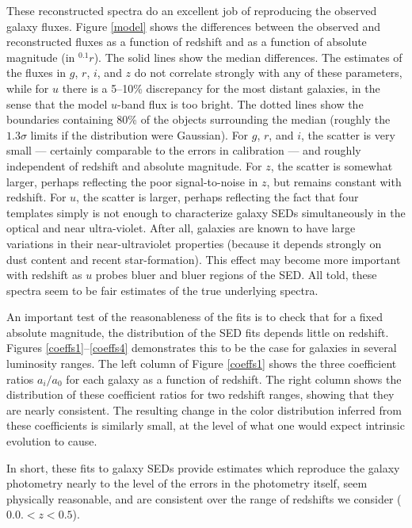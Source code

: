 \documentclass[10pt,preprint]{aastex}
\newcommand{\band}[2]{\ensuremath{^{#1}{#2}}}
\begin{document}
These reconstructed spectra do an excellent job of reproducing the
observed galaxy fluxes. Figure \ref{model} shows the differences
between the observed and reconstructed fluxes as a function of
redshift and as a function of absolute magnitude (in $\band{0.1}{r}$).
The solid lines show the median differences. The estimates of the
fluxes in $g$, $r$, $i$, and $z$ do not correlate strongly with any of
these parameters, while for $u$ there is a 5--10\% discrepancy for the
most distant galaxies, in the sense that the model $u$-band flux is
too bright. The dotted lines show the boundaries containing 80\% of
the objects surrounding the median (roughly the $1.3\sigma$ limits if
the distribution were Gaussian). For $g$, $r$, and $i$, the scatter is
very small --- certainly comparable to the errors in calibration ---
and roughly independent of redshift and absolute magnitude. For $z$,
the scatter is somewhat larger, perhaps reflecting the poor
signal-to-noise in $z$, but remains constant with redshift. For $u$,
the scatter is larger, perhaps reflecting the fact that four templates
simply is not enough to characterize galaxy SEDs simultaneously in the
optical and near ultra-violet. After all, galaxies are known to have
large variations in their near-ultraviolet properties (because it
depends strongly on dust content and recent star-formation). This
effect may become more important with redshift as $u$ probes bluer and
bluer regions of the SED. All told, these spectra seem to be fair
estimates of the true underlying spectra.

An important test of the reasonableness of the fits is to check that
for a fixed absolute magnitude, the distribution of the SED fits
depends little on redshift. Figures \ref{coeffs1}--\ref{coeffs4}
demonstrates this to be the case for galaxies in several luminosity
ranges. The left column of Figure \ref{coeffs1} shows the three
coefficient ratios $a_i/a_0$ for each galaxy as a function of
redshift. The right column shows the distribution of these coefficient
ratios for two redshift ranges, showing that they are nearly
consistent. The resulting change in the color distribution inferred
from these coefficients is similarly small, at the level of what one
would expect intrinsic evolution to cause.

In short, these fits to galaxy SEDs provide estimates which reproduce
the galaxy photometry nearly to the level of the errors in the
photometry itself, seem physically reasonable, and are consistent over
the range of redshifts we consider ($0.0. < z < 0.5$).
\end{document}
